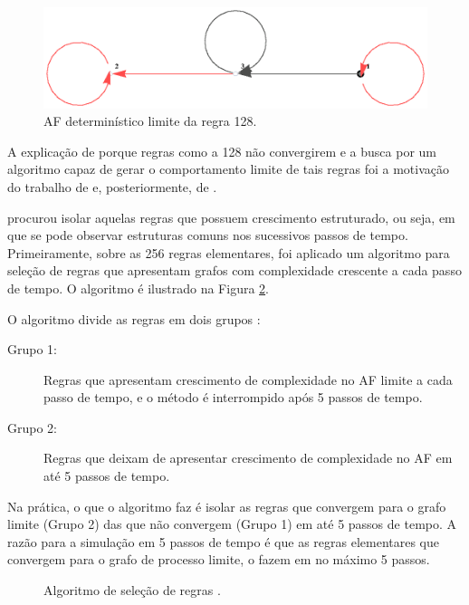 \documentclass[12pt,a4paper]{article}
\begin{document}
\begin{figure}[htp]
\begin{center}
\includegraphics[scale=0.8]{img/limit128.eps}
\caption{AF determinístico limite da regra 128.}
\label{fig:limit128}
\end{center}
\end{figure}

A explicação de porque regras como a 128 não convergirem e a busca por um
algoritmo capaz de gerar o comportamento limite de tais regras foi
a motivação do trabalho de  e, posteriormente,
de .

 procurou isolar aquelas regras
que possuem crescimento estruturado, ou seja, em que se pode observar
estruturas comuns nos sucessivos passos de tempo. Primeiramente, sobre as
256 regras elementares, foi aplicado um algoritmo para seleção de regras
que apresentam grafos com complexidade crescente a cada passo de tempo. O
algoritmo é ilustrado na Figura \ref{fig:rulesel}.

O algoritmo divide as regras em dois grupos :

\begin{description}
\item[Grupo 1:] Regras que apresentam crescimento de complexidade no AF
limite a cada passo de tempo, e o método é interrompido após 5 passos de
tempo.
\item[Grupo 2:] Regras que deixam de apresentar crescimento de complexidade no
AF em até 5 passos de tempo.
\end{description}

Na prática, o que o algoritmo faz é isolar as regras que convergem para o
grafo limite (Grupo 2) das que não convergem (Grupo 1) em até 5
passos de tempo. A razão para a simulação em 5 passos de tempo é que
as regras elementares que convergem para o grafo de processo limite, o
fazem em no máximo 5 passos.

\begin{figure}[H]
\begin{center}
\begin{tikzpicture}[node distance=3cm, auto]

\end{tikzpicture}
\caption[Algoritmo de seleção de regras]
{Algoritmo de seleção de regras .}
\label{fig:rulesel}
\end{center}
\end{figure}
\end{document}
